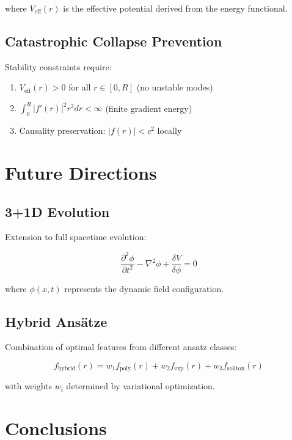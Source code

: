 \documentclass[12pt,a4paper]{article}
\begin{document}
where $V_{\text{eff}}(r)$ is the effective potential derived from the energy functional.

\subsection{Catastrophic Collapse Prevention}

Stability constraints require:

\begin{enumerate}
\item $V_{\text{eff}}(r) > 0$ for all $r \in [0, R]$ (no unstable modes)
\item $\int_0^R |f'(r)|^2 r^2 dr < \infty$ (finite gradient energy)
\item Causality preservation: $|f(r)| < c^2$ locally
\end{enumerate}

\section{Future Directions}

\subsection{3+1D Evolution}

Extension to full spacetime evolution:

\begin{equation}
\frac{\partial^2 \phi}{\partial t^2} - \nabla^2 \phi + \frac{\delta V}{\delta \phi} = 0
\end{equation}

where $\phi(x,t)$ represents the dynamic field configuration.

\subsection{Hybrid Ansätze}

Combination of optimal features from different ansatz classes:

\begin{equation}
f_{\text{hybrid}}(r) = w_1 f_{\text{poly}}(r) + w_2 f_{\text{exp}}(r) + w_3 f_{\text{soliton}}(r)
\end{equation}

with weights $w_i$ determined by variational optimization.

\section{Conclusions}
\end{document}
